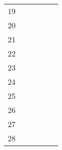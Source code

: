 \begin{table}[ht]
\begin{tabular}{c|lllll}
    19                       &                                          &                                           &                                                &                                    &                                      \\
    20                       &                                          &                                           &                                                &                                    &                                      \\
    21                       &                                          &                                           &                                                &                                    &                                      \\
    22                       &                                          &                                           &                                                &                                    &                                      \\
    23                       &                                          &                                           &                                                &                                    &                                      \\
    24                       &                                          &                                           &                                                &                                    &                                      \\
    25                       &                                          &                                           &                                                &                                    &                                      \\
    26                       &                                          &                                           &                                                &                                    &                                      \\
    27                       &                                          &                                           &                                                &                                    &                                      \\
    28                       &                                          &                                           &                                                &                                    &                                      \\

\end{tabular}
\end{table}
